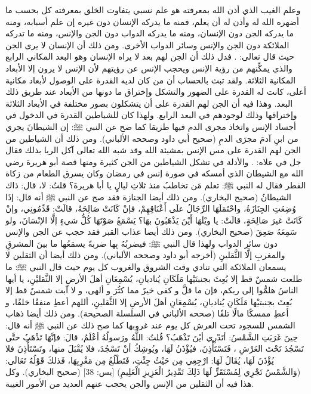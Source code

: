 وعلم الغيب الذي أذن الله بمعرفته هو علم نسبي يتفاوت الخلق بمعرفته كل بحسب ما أضهره الله له وأذن له أن يعلم، فمنه ما يدركه الإنسان دون غيره إن علم أسبابه، ومنه ما يدركه الجن دون الإنسان، ومنه ما يدركه الدواب دون الجن والإنس، ومنه ما تدركه الملائكة دون الجن والإنس وسائر الدواب الأخرى. ومن ذلك أن الإنسان لا يرى الجن حيث قال تعالى: \quranayah*[7][27][17-25] {\footnotesize \surahname*[7]}. فدل ذلك أن الجن لهم بعد لا يراه الإنسان وهو البعد المكاني الرابع والذي يمكِّنهم من رؤية الإنس ويحجب الإنس عن رؤيتهم لأن الإنس لا يرون إلا الأبعاد المكانية الثلاثة. ولقد تبث بالحساب أن من كان لديه القدرة على الوصول لأبعاد مكانية أعلى، كانت له القدرة على الضهور والتشكل وإختراق ما دونها من الأبعاد عند طريق ذلك البعد. وهذا فيه أن الجن لهم القدرة على أن يتشكلون بصور مختلفة في الأبعاد الثلاثة وإختراقها وذلك لوجودهم في البعد الرابع. ولهذا كان للشياطين القدرة في الدخول في أجساد الإنس واتخاذ مجرى الدم فيها طريقا كما صح عن النبي ﷺ: إن الشيطانَ يجري من ابنِ آدمَ مجرَى الدمِ {\footnotesize (صحيح أبي داود وصححه الألباني)}. ومن ذلك أن الشياطين من الجن لهم القدرة على مس الإنس بمشيئة الله وقد شبه الله تعالى آكل الربا بذلك فقال جل في علاه: \quranayah*[2][275][1-13] {\footnotesize \surahname*[2]}. والأدلة في تشكل الشياطين من الجن كثيرة ومنها قصة أبو هريرة رضي الله مع الشيطان الذي أمسكه في صورة إنس في رمضان وكان يسرق الطعام من زكاة الفطر فقال له النبي ﷺ: تعلم مَن تخاطبُ منذ ثلاثِ ليالٍ يا أبا هريرةَ؟ قلتُ: لا، قال: ذاك الشيطانُ {\footnotesize (صحيح البخاري)}. ومن ذلك أيضا الجنازة فقد صح عن النبي ﷺ أنه قال: إذَا وُضِعَتِ الجِنَازَةُ، واحْتَمَلَهَا الرِّجَالُ علَى أَعْنَاقِهِمْ، فإنْ كَانَتْ صَالِحَةً، قالَتْ: قَدِّمُونِي، وإنْ كَانَتْ غيرَ صَالِحَةٍ، قالَتْ: يا ويْلَهَا أَيْنَ يَذْهَبُونَ بهَا؟ يَسْمَعُ صَوْتَهَا كُلُّ شيءٍ إلَّا الإنْسَانَ، ولو سَمِعَهُ صَعِقَ {\footnotesize (صحيح البخاري)}. ومن ذلك أيضا عذاب القبر فقد حجب عن الجن والإنس دون سائر الدواب ولهذا قال النبي ﷺ: فيضربُهُ بِها ضربةً يسمَعُها ما بينَ المشرقِ والمغربِ إلَّا الثَّقلينِ {\footnotesize (أخرجه أبو داود وصححه الألباني)}. ومن ذلك أيضا أن الثقلين لا يسمعان الملائكة التي تنادي وقت الشروق والغروب كل يوم حيث قال النبي ﷺ: ما طلعت شمسٌ قط إلا بُعِثَ بجنبتَيْها مَلَكَانِ يُناديانِ، يُسْمِعَانِ أهلَ الأرضِ إلا الثَّقليْنِ، يا أيها الناسُ هلمُّوا إلى ربكم، فإن ما قلَّ و كفى خيرٌ مما كثُرَ و ألهى، و لا آبت شمسٌ قط إلا بُعِثَ بجنبتيْها مَلَكَانِ يُناديانِ، يُسْمِعَانِ أهلَ الأرضِ إلا الثَّقلينِ، أللهم أعطِ منفقًا خلفًا، و أعطِ ممسكًا مالًا تلفًا {\footnotesize (صححه الألباني في السلسلة الصحيحة)}. ومن ذلك أيضا ذهاب الشمس للسجود تحت العرش كل يوم عند غروبها كما صح ذلك عن النبي ﷺ أنه قال: حِينَ غَرَبَتِ الشَّمْسُ: أتَدْرِي أيْنَ تَذْهَبُ؟ قُلتُ: اللَّهُ ورَسولُهُ أعْلَمُ، قالَ: فإنَّهَا تَذْهَبُ حتَّى تَسْجُدَ تَحْتَ العَرْشِ ، فَتَسْتَأْذِنَ، فيُؤْذَنُ لَهَا، ويُوشِكُ أنْ تَسْجُدَ، فلا يُقْبَلَ منها، وتَسْتَأْذِنَ فلا يُؤْذَنَ لَهَا، يُقَالُ لَهَا: ارْجِعِي مِن حَيْثُ جِئْتِ، فَتَطْلُعُ مِن مَغْرِبِهَا، فَذلكَ قَوْلُهُ تَعَالَى: (وَالشَّمْسُ تَجْرِي لِمُسْتَقَرٍّ لَهَا ذَلِكَ تَقْدِيرُ الْعَزِيزِ الْعَلِيمِ) [يس: 38] {\footnotesize (صحيح البخاري)}. وكل هذا فيه أن الثقلين من الإنس والجن يحجب عنهم العديد من الأمور الغيبة.

